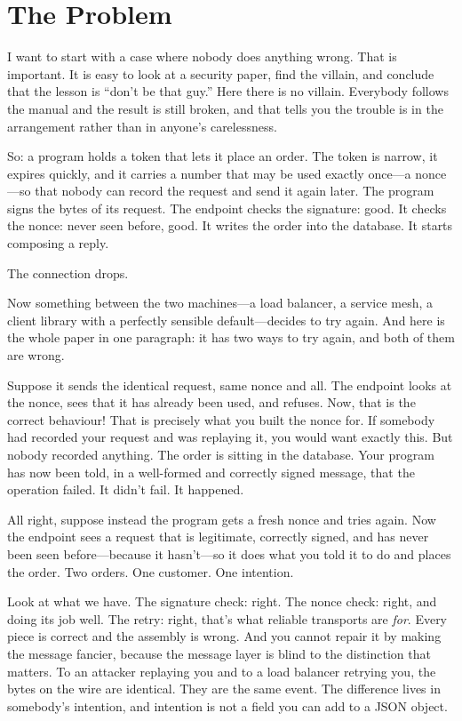 \documentclass[11pt]{article}
\begin{document}
\clearpage

\section{The Problem}
\label{sec:problem}

I want to start with a case where nobody does anything wrong. That is
important. It is easy to look at a security paper, find the villain, and
conclude that the lesson is ``don't be that guy.'' Here there is no villain.
Everybody follows the manual and the result is still broken, and that tells
you the trouble is in the arrangement rather than in anyone's carelessness.

So: a program holds a token that lets it place an order. The token is narrow,
it expires quickly, and it carries a number that may be used exactly
once---a nonce---so that nobody can record the request and send it again
later. The program signs the bytes of its request. The endpoint checks the
signature: good. It checks the nonce: never seen before, good. It writes the
order into the database. It starts composing a reply.

The connection drops.

Now something between the two machines---a load balancer, a service mesh, a
client library with a perfectly sensible default---decides to try again. And
here is the whole paper in one paragraph: it has two ways to try again, and
both of them are wrong.

Suppose it sends the identical request, same nonce and all. The endpoint looks
at the nonce, sees that it has already been used, and refuses. Now, that is
the correct behaviour! That is precisely what you built the nonce for. If
somebody had recorded your request and was replaying it, you would want
exactly this. But nobody recorded anything. The order is sitting in the
database. Your program has now been told, in a well-formed and correctly
signed message, that the operation failed. It didn't fail. It happened.

All right, suppose instead the program gets a fresh nonce and tries again. Now
the endpoint sees a request that is legitimate, correctly signed, and has
never been seen before---because it hasn't---so it does what you told it to
do and places the order. Two orders. One customer. One intention.

Look at what we have. The signature check: right. The nonce check: right, and
doing its job well. The retry: right, that's what reliable transports are
\emph{for}. Every piece is correct and the assembly is wrong. And you cannot
repair it by making the message fancier, because the message layer is blind
to the distinction that matters. To an attacker replaying you and to a load
balancer retrying you, the bytes on the wire are identical. They are the same
event. The difference lives in somebody's intention, and intention is not a
field you can add to a JSON object.
\end{document}
